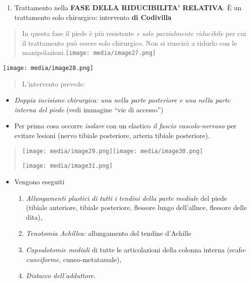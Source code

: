 \documentclass[]{article}
\begin{document}
\begin{enumerate}
\def\labelenumi{\arabic{enumi}.}
\item
  Trattamento nella \textbf{FASE DELLA RIDUCIBILITA' RELATIVA}. È un
  trattamento solo chirurgico: intervento \textbf{di Codivilla}
\end{enumerate}

\begin{quote}
In questa fase il piede è più resistente \emph{e solo parzialmente
riducibile} per cui il trattamento può essere solo chirurgico. Non si
riuscirà a ridurlo con le
manipolazioni.\texttt{[image: media/image27.png]}
\end{quote}

\texttt{[image: media/image28.png]}

\begin{quote}
L'intervento prevede:
\end{quote}

\begin{itemize}
\item
  \emph{Doppia incisione chirurgica: una nella parte posteriore e una
  nella parte interna del piede} (vedi immagine ``vie di accesso'')
\item
  Per prima cosa occorre \emph{isolare} con un elastico \emph{il fascio
  vascolo-nervoso} per evitare lesioni (nervo tibiale posteriore,
  arteria tibiale posteriore).
\end{itemize}

\begin{quote}
\texttt{[image: media/image29.png]}\texttt{[image: media/image30.png]}

\texttt{[image: media/image31.png]}
\end{quote}

\begin{itemize}
\item
  Vengono eseguiti

  \begin{enumerate}
  \def\labelenumi{\alph{enumi}.}
  \item
    \emph{Allungamenti plastici di tutti i tendini della parte mediale}
    del piede (tibiale anteriore, tibiale posteriore, flessore lungo
    dell'alluce, flessore delle dita),
  \item
    \emph{\emph{Tenotomia Achillea:}} allungamento del tendine d'Achille
  \item
    \emph{Capsulotomie mediali} di tutte le articolazioni della colonna
    interna (scafo-\emph{cuneiforme}, cuneo-metatarsale),
  \item
    \emph{Distacco dell'adduttore}.
  \end{enumerate}
\end{itemize}
\end{document}
